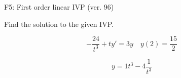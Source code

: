 \begin{exercise}
  \begin{exerciseTitle}F5: First order linear IVP (ver. 96)\end{exerciseTitle}
  \begin{exerciseStatement}
    
Find the solution to the given IVP.

    
\[-\frac{24}{t^{3}} +ty'= 3 y \hspace{1em} y( 2 ) = \frac{15}{2}\]

  \end{exerciseStatement}
  \begin{exerciseAnswer}
    
\[y= 1 t^ 3 -4 \frac{1}{t^{3}}\]

  \end{exerciseAnswer}
\end{exercise}